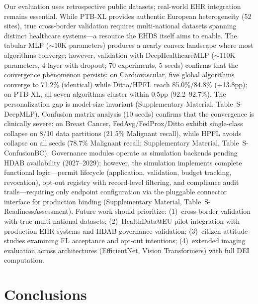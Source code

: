 \documentclass[conference]{IEEEtran}
\begin{document}
Our evaluation uses retrospective public datasets; real-world EHR integration remains essential. While PTB-XL provides authentic European heterogeneity (52 sites), true cross-border validation requires multi-national datasets spanning distinct healthcare systems---a resource the EHDS itself aims to enable. The tabular MLP ($\sim$10K parameters) produces a nearly convex landscape where most algorithms converge; however, validation with DeepHealthcareMLP ($\sim$110K parameters, 4-layer with dropout; 70 experiments, 5 seeds) confirms that the convergence phenomenon persists: on Cardiovascular, five global algorithms converge to 71.2\% (identical) while Ditto/HPFL reach 85.0\%/$84.8$\% ($+$13.8pp); on PTB-XL, all seven algorithms cluster within 0.5pp (92.2--92.7\%). The personalization gap is model-size invariant (Supplementary Material, Table~S-DeepMLP). Confusion matrix analysis (10 seeds) confirms that the convergence is clinically severe: on Breast Cancer, FedAvg/FedProx/Ditto exhibit single-class collapse on 8/10 data partitions (21.5\% Malignant recall), while HPFL avoids collapse on all seeds (78.7\% Malignant recall; Supplementary Material, Table~S-ConfusionBC). Governance modules operate as simulation backends pending HDAB availability (2027--2029); however, the simulation implements complete functional logic---permit lifecycle (application, validation, budget tracking, revocation), opt-out registry with record-level filtering, and compliance audit trails---requiring only endpoint configuration via the pluggable connector interface for production binding (Supplementary Material, Table~S-ReadinessAssessment). Future work should prioritize: (1)~cross-border validation with true multi-national datasets; (2)~HealthData@EU pilot integration with production EHR systems and HDAB governance validation; (3)~citizen attitude studies examining FL acceptance and opt-out intentions; (4)~extended imaging evaluation across architectures (EfficientNet, Vision Transformers) with full DEI computation.

\section{Conclusions}
\label{sec:conclusions}
\end{document}
